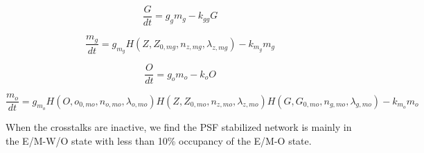 \documentclass{article}
\begin{document}
\begin{equation}
\frac{G}{dt} = g_g m_g - k_{gg} G
\end{equation}

\begin{equation}
\frac{m_g}{dt} = g_{m_g} H(Z,Z_{0,mg},n_{z,mg},\lambda_{z,mg}) - k_{m_g} m_g
\end{equation}

\begin{equation}
\frac{O}{dt} = g_o m_o - k_{o} O
\end{equation}

\begin{equation}
\frac{m_o}{dt} = g_{m_o}H(O,o_{0,mo},n_{o,mo},\lambda_{o,mo}) H(Z,Z_{0,mo},n_{z,mo},\lambda_{z,mo}) H(G,G_{0,mo},n_{g,mo},\lambda_{g,mo}) - k_{m_o} m_o
\end{equation}

When the crosstalks are inactive, we find the PSF stabilized network is mainly in the E/M-W/O state with less than 10\% occupancy of the E/M-O state.

\end{document}
